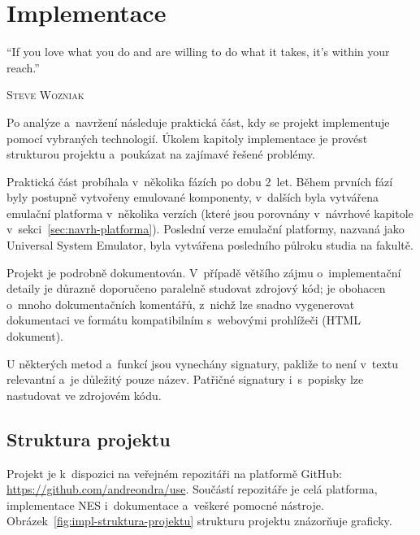 \chapter{Implementace}
\epigraph{
	\enquote{If you love what you do and are willing to do what it takes, it's within your reach.}
}{\textsc{Steve Wozniak}}

Po analýze a~navržení následuje praktická část, kdy se projekt implementuje pomocí vybraných technologií. 
Úkolem kapitoly implementace je provést strukturou projektu a~poukázat na zajímavé řešené problémy.

Praktická část probíhala v~několika fázích po dobu 2~let. Během prvních fází byly postupně vytvořeny emulované komponenty, v~dalších byla vytvářena emulační platforma v~několika verzích (které jsou porovnány v~návrhové kapitole v~sekci~\ref{sec:navrh-platforma}). Poslední verze emulační platformy, nazvaná jako Universal System Emulator, byla vytvářena posledního půlroku studia na fakultě.

Projekt je podrobně dokumentován. V~případě většího zájmu o~implementační detaily je důrazně doporučeno paralelně studovat zdrojový kód; je obohacen o~mnoho dokumentačních komentářů, z~nichž lze snadno vygenerovat dokumentaci ve formátu kompatibilním s~webovými prohlížeči (HTML dokument).

\begin{note}
	U některých metod a~funkcí jsou vynechány signatury, pakliže to není v~textu relevantní a~je důležitý pouze název. Patřičné signatury i~s~popisky lze nastudovat ve zdrojovém kódu.
\end{note}

\section{Struktura projektu}
Projekt je k~dispozici na veřejném repozitáři na platformě GitHub: \url{https://github.com/andreondra/use}. Součástí repozitáře je celá platforma, implementace NES i~dokumentace a~veškeré pomocné nástroje. Obrázek~\ref{fig:impl-struktura-projektu} strukturu projektu znázorňuje graficky.


